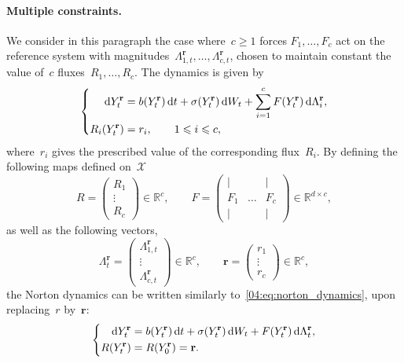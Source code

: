     \paragraph{Multiple constraints.}
    We consider in this paragraph the case where~$c\geq 1$ forces $F_1,\dots,F_c$ act on the reference system with magnitudes~$\Lambda_{1,t}^{\mathbf{r}},\dots,\Lambda_{c,t}^{\mathbf{r}}$, chosen to maintain constant the value of~$c$ fluxes~$R_1,\dots,R_c$. The dynamics is given by
    \[\left\{\begin{aligned}\mathrm{d} Y_t^{\mathbf r} &= b(Y_t^{\mathbf r})\,\mathrm{d} t + \sigma(Y_t^{\mathbf r})\,\mathrm{d} W_t + \sum_{i=1}^c F(Y_t^{\mathbf r})\,\mathrm{d} \Lambda_i^{\mathbf r},\\ R_i(Y_t^{\mathbf r}) &= r_i,\qquad 1\leqslant i \leqslant c,\end{aligned}\right.\]
    where~$r_i$ gives the prescribed value of the corresponding flux~$R_i$.
    By defining the following maps defined on~$\mathcal X$
    \[R = \begin{pmatrix}R_1\\\vdots\\R_c\end{pmatrix} \in\mathbb{R}^c,\qquad F = \begin{pmatrix}|&  & |\\ F_1 & \dots & F_c \\ | &  & |\end{pmatrix}\in \mathbb{R}^{d\times c},\]
    as well as the following vectors,
    \[\Lambda_t^{\mathbf r}=\begin{pmatrix}\Lambda_{1,t}^{\mathbf r} \\ \vdots \\ \Lambda_{c,t}^{\mathbf r}\end{pmatrix}\in \mathbb{R}^{c},\qquad \mathbf{r}=\begin{pmatrix} r_1 \\ \vdots \\ r_c\end{pmatrix}\in\mathbb{R}^c,\]
    the Norton dynamics can be written similarly to~\eqref{04:eq:norton_dynamics}, upon replacing~$r$ by~$\mathbf{r}$:
    \begin{equation}
    \label{04:eq:norton_dynamics_rvec}
    \left\{\begin{aligned}
    \mathrm{d} Y^{\mathbf r}_t &= b(Y^{\mathbf r}_t)\, \mathrm{d} t + \sigma(Y^{\mathbf r}_t)\, \mathrm{d} W_t +  F(Y^{\mathbf r}_t)\,\mathrm{d}\Lambda^{\mathbf r}_t,\\
    R(Y^{\mathbf r}_t) &= R(Y^{\mathbf r}_0)=\mathbf{r}.
    \end{aligned}\right.
\end{equation}
